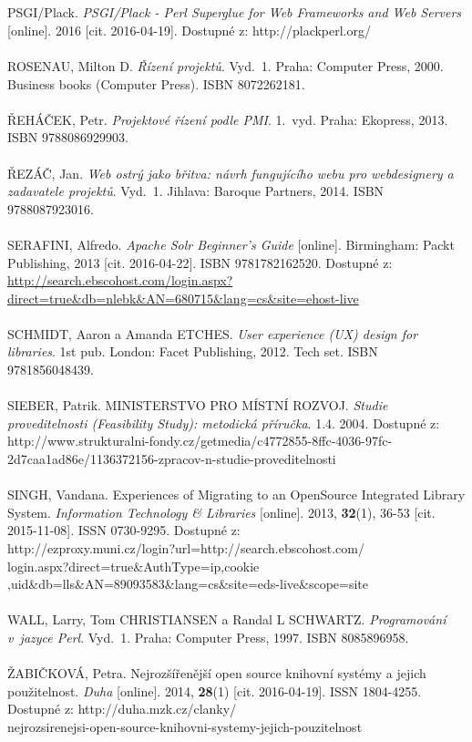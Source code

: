 \documentclass[
	11pt, oneside, printed, final, palatino, monochrome
	microtype,
	table,   %
	lof,     %
	lot     %
]{fithesis3}
\begin{document}
{~\\ ~\\ \noindent
[27] PSGI/Plack. \textit{PSGI/Plack - Perl Superglue for Web Frameworks and Web Servers} [online]. 2016 [cit. 2016-04-19]. Dostupné z: http://plackperl.org/
~\\ ~\\ \noindent
[28] ROSENAU, Milton D. \textit{Řízení projektů}. Vyd.~1. Praha: Computer Press, 2000. Business books (Computer Press). ISBN 8072262181.
~\\ ~\\ \noindent
[29] ŘEHÁČEK, Petr. \textit{Projektové řízení podle PMI}. 1.~vyd. Praha: Ekopress, 2013. ISBN 9788086929903.
~\\ ~\\ \noindent
[30] ŘEZÁČ, Jan. \textit{Web ostrý jako břitva: návrh fungujícího webu pro webdesignery a zadavatele projektů}. Vyd.~1. Jihlava: Baroque Partners, 2014. ISBN 9788087923016.
~\\ ~\\ \noindent
[31] SERAFINI, Alfredo. \textit{Apache Solr Beginner’s Guide} [online]. Birmingham: Packt Publishing, 2013 [cit. 2016-04-22]. ISBN 9781782162520. Dostupné z: \url{http://search.ebscohost.com/login.aspx?direct=true&db=nlebk&AN=680715&lang=cs&site=ehost-live}
~\\ ~\\ \noindent
[32] SCHMIDT, Aaron a Amanda ETCHES. \textit{User experience (UX) design for libraries}. 1st pub. London: Facet Publishing, 2012. Tech set. ISBN 9781856048439.
~\\ ~\\ \noindent
[33] SIEBER, Patrik. MINISTERSTVO PRO MÍSTNÍ ROZVOJ. \textit{Studie proveditelnosti (Feasibility Study): metodická příručka}. 1.4. 2004. Dostupné z: \\http://www.strukturalni-fondy.cz/getmedia/c4772855-8ffc-4036-97fc-\\2d7caa1ad86e/1136372156-zpracov-n-studie-proveditelnosti
~\\ ~\\ \noindent
[34] SINGH, Vandana. Experiences of Migrating to an OpenSource Integrated Library System. \textit{Information Technology \& Libraries} [online]. 2013, \textbf{32}(1), 36-53 [cit. 2015-11-08]. ISSN 0730-9295. Dostupné z: \\	 http://ezproxy.muni.cz/login?url=http://search.ebscohost.com/\\login.aspx?direct=true\&AuthType=ip,cookie\\,uid\&db=lls\&AN=89093583\&lang=cs\&site=eds-live\&scope=site
~\\ ~\\ \noindent
[35] WALL, Larry, Tom CHRISTIANSEN a Randal L SCHWARTZ. \textit{Programování v~jazyce Perl}. Vyd.~1. Praha: Computer Press, 1997. ISBN 8085896958.
~\\ ~\\ \noindent
[36] ŽABIČKOVÁ, Petra. Nejrozšířenější open source knihovní systémy a jejich použitelnost. \textit{Duha} [online]. 2014, 	\textbf{28}(1) [cit. 2016-04-19]. ISSN 1804-4255. Dostupné z: http://duha.mzk.cz/clanky/\\nejrozsirenejsi-open-source-knihovni-systemy-jejich-pouzitelnost

}
\end{document}
